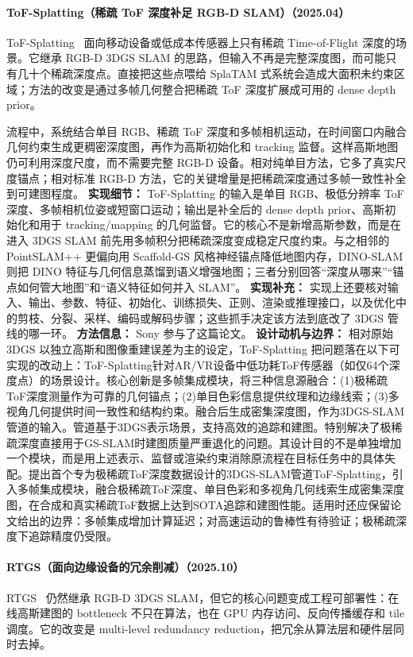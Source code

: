\paragraph{ToF-Splatting（稀疏 ToF 深度补足 RGB-D SLAM）（2025.04）}
ToF-Splatting~\cite{2504_16545} 面向移动设备或低成本传感器上只有稀疏 Time-of-Flight 深度的场景。它继承 RGB-D 3DGS SLAM 的思路，但输入不再是完整深度图，而可能只有几十个稀疏深度点。直接把这些点喂给 SplaTAM 式系统会造成大面积未约束区域；方法的改变是通过多帧几何整合把稀疏 ToF 深度扩展成可用的 dense depth prior。

流程中，系统结合单目 RGB、稀疏 ToF 深度和多帧相机运动，在时间窗口内融合几何约束生成更稠密深度图，再作为高斯初始化和 tracking 监督。这样高斯地图仍可利用深度尺度，而不需要完整 RGB-D 设备。相对纯单目方法，它多了真实尺度锚点；相对标准 RGB-D 方法，它的关键增量是把稀疏深度通过多帧一致性补全到可建图程度。
\textbf{实现细节：} ToF-Splatting 的输入是单目 RGB、极低分辨率 ToF 深度、多帧相机位姿或短窗口运动；输出是补全后的 dense depth prior、高斯初始化和用于 tracking/mapping 的几何监督。它的核心不是新增高斯参数，而是在进入 3DGS SLAM 前先用多帧积分把稀疏深度变成稳定尺度约束。与之相邻的 PointSLAM++ 更偏向用 Scaffold-GS 风格神经锚点降低地图内存，DINO-SLAM 则把 DINO 特征与几何信息蒸馏到语义增强地图；三者分别回答“深度从哪来”“锚点如何管大地图”和“语义特征如何并入 SLAM”。
\textbf{实现补充：} 实现上还要核对输入、输出、参数、特征、初始化、训练损失、正则、渲染或推理接口，以及优化中的剪枝、分裂、采样、编码或解码步骤；这些抓手决定该方法到底改了 3DGS 管线的哪一环。
\textbf{方法信息：} Sony 参与了这篇论文。
\textbf{设计动机与边界：} 相对原始 3DGS 以独立高斯和图像重建误差为主的设定，ToF-Splatting 把问题落在以下可实现的改动上：ToF-Splatting针对AR/VR设备中低功耗ToF传感器（如仅64个深度点）的场景设计。核心创新是多帧集成模块，将三种信息源融合：(1)极稀疏ToF深度测量作为可靠的几何锚点；(2)单目色彩信息提供纹理和边缘线索；(3)多视角几何提供时间一致性和结构约束。融合后生成密集深度图，作为3DGS-SLAM管道的输入。管道基于3DGS表示场景，支持高效的追踪和建图。特别解决了极稀疏深度直接用于GS-SLAM时建图质量严重退化的问题。其设计目的不是单独增加一个模块，而是用上述表示、监督或渲染约束消除原流程在目标任务中的具体失配。提出首个专为极稀疏ToF深度数据设计的3DGS-SLAM管道ToF-Splatting，引入多帧集成模块，融合极稀疏ToF深度、单目色彩和多视角几何线索生成密集深度图，在合成和真实稀疏ToF数据上达到SOTA追踪和建图性能。适用时还应保留论文给出的边界：多帧集成增加计算延迟；对高速运动的鲁棒性有待验证；极稀疏深度下追踪精度仍受限。
\paragraph{RTGS（面向边缘设备的冗余削减）（2025.10）}
RTGS~\cite{2510_06644} 仍然继承 RGB-D 3DGS SLAM，但它的核心问题变成工程可部署性：在线高斯建图的 bottleneck 不只在算法，也在 GPU 内存访问、反向传播缓存和 tile 调度。它的改变是 multi-level redundancy reduction，把冗余从算法层和硬件层同时去掉。


